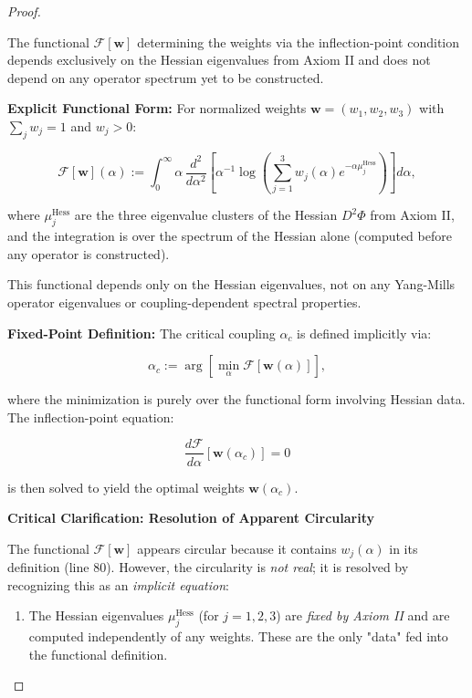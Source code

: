 \begin{lemma}
\begin{proof}
\begin{lemma}
The functional $\mathcal{F}[\mathbf{w}]$ determining the weights via the inflection-point condition depends exclusively on the Hessian eigenvalues from Axiom II and does not depend on any operator spectrum yet to be constructed.

\noindent\textbf{Explicit Functional Form:} For normalized weights $\mathbf{w} = (w_1, w_2, w_3)$ with $\sum_j w_j = 1$ and $w_j > 0$:

\begin{equation}
\mathcal{F}[\mathbf{w}](\alpha) := \int_0^\infty \alpha \, \frac{d^2}{d\alpha^2} \left[ \alpha^{-1} \log\left( \sum_{j=1}^3 w_j(\alpha) e^{-\alpha \mu_j^{\mathrm{Hess}}} \right) \right] d\alpha,
\end{equation}

where $\mu_j^{\mathrm{Hess}}$ are the three eigenvalue clusters of the Hessian $D^2\Phi$ from Axiom II, and the integration is over the spectrum of the Hessian alone (computed before any operator is constructed).

This functional depends only on the Hessian eigenvalues, not on any Yang-Mills operator eigenvalues or coupling-dependent spectral properties.

\noindent\textbf{Fixed-Point Definition:} The critical coupling $\alpha_c$ is defined implicitly via:

\begin{equation}
\alpha_c := \arg\left[\min_\alpha \mathcal{F}[\mathbf{w}(\alpha)]\right],
\end{equation}

where the minimization is purely over the functional form involving Hessian data. The inflection-point equation:

\begin{equation}
\frac{d\mathcal{F}}{d\alpha}[\mathbf{w}(\alpha_c)] = 0
\end{equation}

is then solved to yield the optimal weights $\mathbf{w}(\alpha_c)$.

\noindent\textbf{Critical Clarification: Resolution of Apparent Circularity}

The functional $\mathcal{F}[\mathbf{w}]$ appears circular because it contains $w_j(\alpha)$ in its definition (line 80). However, the circularity is \textit{not real}; it is resolved by recognizing this as an \textit{implicit equation}:

\begin{enumerate}
\item[\textbf{(i) Axiomatic Input:}] The Hessian eigenvalues $\mu_j^{\mathrm{Hess}}$ (for $j=1,2,3$) are \textit{fixed by Axiom II} and are computed independently of any weights. These are the only "data" fed into the functional definition.


\end{enumerate}
\end{lemma}
\end{proof}
\end{lemma}
